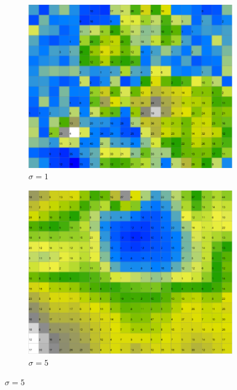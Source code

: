\documentclass{acm_proc_article-sp}
\begin{document}
\begin{figure}
\centering
    \centering
    \begin{subfigure}[b]{0.30\linewidth}
        \includegraphics[width=\linewidth]{img/wine-newmid-activity-histogram-sigma-1}
        \caption{$\sigma=1$}
        \label{fig:wine-newmid-activity-histogram-sigma-1}
    \end{subfigure}
    \begin{subfigure}[b]{0.30\linewidth}
        \includegraphics[width=\linewidth]{img/wine-newmid-activity-histogram-sigma-5}
        \caption{$\sigma=5$}
        \label{fig:wine-newmid-activity-histogram-sigma-5}

\end{subfigure}
\end{figure}
\end{document}
